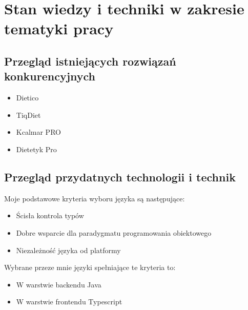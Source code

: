 \chapter{Stan wiedzy i techniki w zakresie tematyki pracy}
\section{Przegląd istniejących rozwiązań konkurencyjnych}
\begin{itemize}
    \item Dietico
    \item TiqDiet
    \item Kcalmar PRO
    \item Dietetyk Pro
\end{itemize}

\section{Przegląd przydatnych technologii i technik}
Moje podstawowe kryteria wyboru języka są następujące:
\begin{itemize}
    \item Ścisła kontrola typów
    \item Dobre wsparcie dla paradygmatu programowania obiektowego
    \item Niezależność języka od platformy
\end{itemize}

Wybrane przeze mnie języki spełniające te kryteria to:
\begin{itemize}
    \item W warstwie backendu Java
    \item W warstwie frontendu Typescript
\end{itemize}

